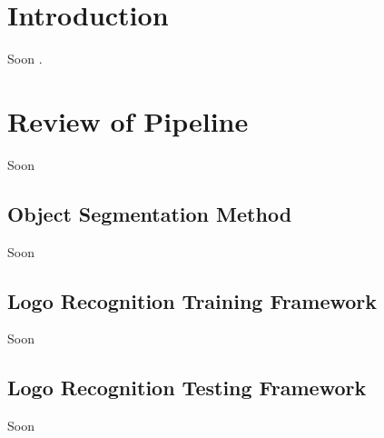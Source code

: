 \section{Introduction}\label{sec:4.1}
\vspace{-0.5cm}
\noindent Soon \cite{Duttweiler}.

\vspace{-0.3cm}




\section{Review of Pipeline}\label{sec:4.2}
\vspace{-0.5cm}
\noindent Soon

\vspace{-0.3cm}

\subsection{Object Segmentation Method}\label{sec:4.2.1}
\vspace{-0.5cm}
\noindent Soon


\vspace{-0.3cm}


\subsection{Logo Recognition Training Framework}\label{sec:4.2.2}
\vspace{-0.5cm}
\noindent Soon


\vspace{-0.3cm}


\subsection{Logo Recognition Testing Framework}\label{sec:4.2.3}
\vspace{-0.5cm}
\noindent Soon


